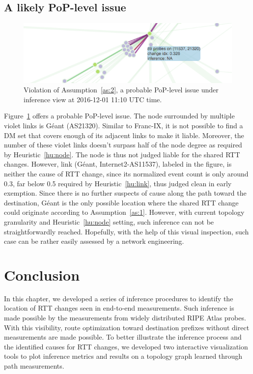 \subsection{A likely PoP-level issue}
\begin{figure}[!htb]
\centering
\includegraphics[width=.8\textwidth]{gfx/chap5/case_pop_issue.png}
\caption{Violation of Assumption~\ref{as:2}, a probable PoP-level issue under inference view at 2016-12-01 11:10 UTC time.}
\label{fig:case_pop_issue}
\end{figure}

Figure~\ref{fig:case_pop_issue} offers a probable PoP-level issue. The node surrounded by multiple violet links is 
Géant (AS21320). 
Similar to Franc-IX, it is not possible to find a \ac{DM} set that covers enough of its adjacent links to make it liable. Moreover, the number of these violet links doesn't surpass half of the node degree as required by Heuristic~\ref{hu:node}. The node is thus not judged liable for the shared RTT changes. 
However, link (Géant, Internet2-AS11537), labeled in the figure, is neither the cause of RTT change, since its normalized event count is only around 0.3, far below 0.5 required by Heuristic~\ref{hu:link}, thus judged clean in early exemption.
Since there is no further suspects of cause along the path toward the destination, Géant is the only possible location where the shared RTT change could originate according to Assumption~\ref{as:1}. However, with current topology granularity and Heuristic~\ref{hu:node} setting, such inference can not be straightforwardly reached.
Hopefully, with the help of this visual inspection, such case can be rather easily assessed by a network engineering.

\section*{Conclusion}
In this chapter, we developed a series of inference procedures to identify the location of RTT changes seen in end-to-end measurements.
Such inference is made possible by the measurements from widely distributed RIPE Atlas probes.
With this visibility, route optimization toward destination prefixes without direct measurements are made possible.
To better illustrate the inference process and the identified causes for RTT changes, we developed two interactive visualization tools to plot inference metrics and results on a topology graph learned through path measurements.

